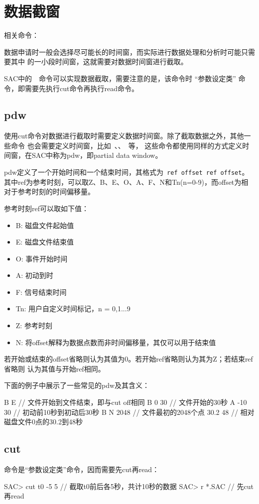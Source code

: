 \section{数据截窗}
相关命令：

数据申请时一般会选择尽可能长的时间窗，而实际进行数据处理和分析时可能只需要其中
的一小段时间窗，这就需要对数据时间窗进行截取。

SAC中的~~命令可以实现数据截取，需要注意的是，该命令时
``参数设定类'' 命令，即需要先执行cut命令再执行read命令。

\subsection{pdw}
\label{subsec:pdw}
使用cut命令对数据进行截取时需要定义数据时间窗。除了截取数据之外，其他一些命令
也会需要定义时间窗，比如~、、~等，
这些命令都使用同样的方式定义时间窗，在SAC中称为pdw，即partial data window。

pdw定义了一个开始时间和一个结束时间，其格式为~\verb+ref offset ref offset+。
其中ref为参考时刻，可以取Z、B、E、O、A、F、N和Tn(n=0-9)，而offset为相对于参考时刻的时间偏移量。

参考时刻ref可以取如下值：
\begin{itemize}
\item B: 磁盘文件起始值
\item E: 磁盘文件结束值
\item O: 事件开始时间
\item A: 初动到时
\item F: 信号结束时间
\item Tn: 用户自定义时间标记，n = 0,1...9
\item Z: 参考时刻
\item N: 将offset解释为数据点数而非时间偏移量，其仅可以用于结束值
\end{itemize}

若开始或结束的offset省略则认为其值为0。若开始ref省略则认为其为Z；若结束ref省略则
认为其值与开始ref相同。

下面的例子中展示了一些常见的pdw及其含义：
\begin{SACCode}
 B E        // 文件开始到文件结束，即与cut off相同
 B 0 30     // 文件开始的30秒
 A -10 30   // 初动前10秒到初动后30秒
 B N 2048   // 文件最初的2048个点
 30.2 48    // 相对磁盘文件0点的30.2到48秒
\end{SACCode}

\subsection{cut}
命令是``参数设定类''命令，因而需要先cut再read：
\begin{SACCode}
SAC> cut t0 -5 5        // 截取t0前后各5秒，共计10秒的数据
SAC> r *.SAC            // 先cut再read
\end{SACCode}
